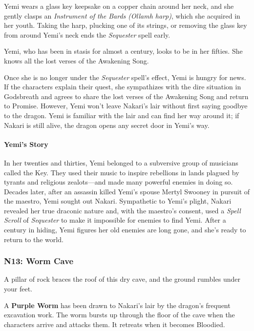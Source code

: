 \documentclass[letterpaper, 11pt, twocolumn]{dndbook}
\begin{document}
Yemi wears a glass key keepsake on a copper chain around her neck, and she gently clasps an \textit{Instrument of the Bards (Ollamh harp)}, which she acquired in her youth. Taking the harp, plucking one of its strings, or removing the glass key from around Yemi's neck ends the \textit{Sequester} spell early.

Yemi, who has been in stasis for almost a century, looks to be in her fifties. She knows all the lost verses of the Awakening Song.

Once she is no longer under the \textit{Sequester} spell's effect, Yemi is hungry for news. If the characters explain their quest, she sympathizes with the dire situation in Godsbreath and agrees to share the lost verses of the Awakening Song and return to Promise. However, Yemi won't leave Nakari's lair without first saying goodbye to the dragon. Yemi is familiar with the lair and can find her way around it; if Nakari is still alive, the dragon opens any secret door in Yemi's way.

\paragraph{Yemi's Story}

In her twenties and thirties, Yemi belonged to a subversive group of musicians called the Key. They used their music to inspire rebellions in lands plagued by tyrants and religious zealots---and made many powerful enemies in doing so. Decades later, after an assassin killed Yemi's spouse Mertyl Swooney in pursuit of the maestro, Yemi sought out Nakari. Sympathetic to Yemi's plight, Nakari revealed her true draconic nature and, with the maestro's consent, used a \textit{Spell Scroll} of \textit{Sequester} to make it impossible for enemies to find Yemi. After a century in hiding, Yemi figures her old enemies are long gone, and she's ready to return to the world.


\subsubsection{N13: Worm Cave}

\begin{DndReadAloud}
A pillar of rock braces the roof of this dry cave, and the ground rumbles under your feet.
\end{DndReadAloud}

A \textbf{Purple Worm} has been drawn to Nakari's lair by the dragon's frequent excavation work. The worm bursts up through the floor of the cave when the characters arrive and attacks them. It retreats when it becomes Bloodied.
\end{document}
